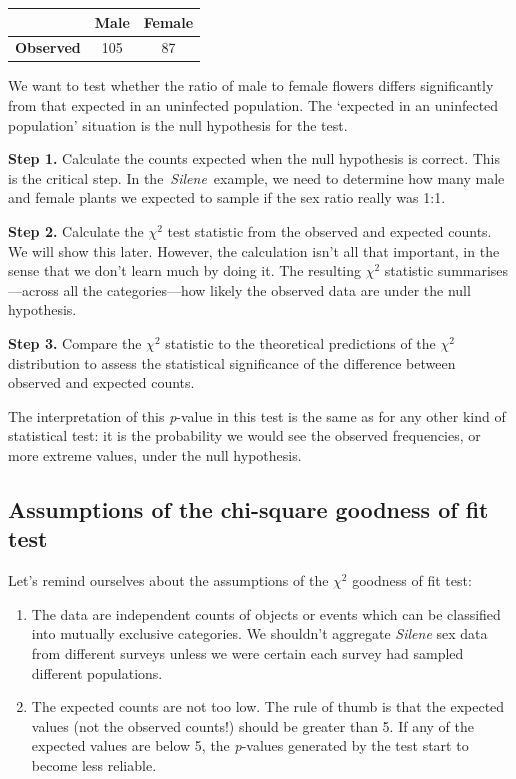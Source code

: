 \documentclass[
]{book}
\begin{document}
\begin{longtable}[]{@{}lcc@{}}
\toprule
& Male & Female \\
\midrule
\endhead
\textbf{Observed} & 105 & 87 \\
\bottomrule
\end{longtable}

We want to test whether the ratio of male to female flowers differs significantly from that expected in an uninfected population. The `expected in an uninfected population' situation is the null hypothesis for the test.

\textbf{Step 1.} Calculate the counts expected when the null hypothesis is correct. This is the critical step. In the~\emph{Silene}~example, we need to determine how many male and female plants we expected to sample if the sex ratio really was 1:1.

\textbf{Step 2.} Calculate the \(\chi^{2}\) test statistic from the observed and expected counts. We will show this later. However, the calculation isn't all that important, in the sense that we don't learn much by doing it. The resulting \(\chi^{2}\) statistic summarises---across all the categories---how likely the observed data are under the null hypothesis.

\textbf{Step 3.} Compare the \(\chi^{2}\) statistic to the theoretical predictions of the \(\chi^{2}\) distribution to assess the statistical significance of the difference between observed and expected counts.

The interpretation of this \emph{p}-value in this test is the same as for any other kind of statistical test: it is the probability we would see the observed frequencies, or more extreme values, under the null hypothesis.

\hypertarget{assumptions-of-the-chi-square-goodness-of-fit-test}{%
\subsection{Assumptions of the chi-square goodness of fit test}\label{assumptions-of-the-chi-square-goodness-of-fit-test}}

Let's remind ourselves about the assumptions of the \(\chi^{2}\) goodness of fit test:

\begin{enumerate}
\def\labelenumi{\arabic{enumi}.}
\item
  The data are independent counts of objects or events which can be classified into mutually exclusive categories. We shouldn't aggregate \emph{Silene} sex data from different surveys unless we were certain each survey had sampled different populations.
\item
  The expected counts are not too low. The rule of thumb is that the expected values (not the observed counts!) should be greater than 5. If any of the expected values are below 5, the \emph{p}-values generated by the test start to become less reliable.
\end{enumerate}
\end{document}
